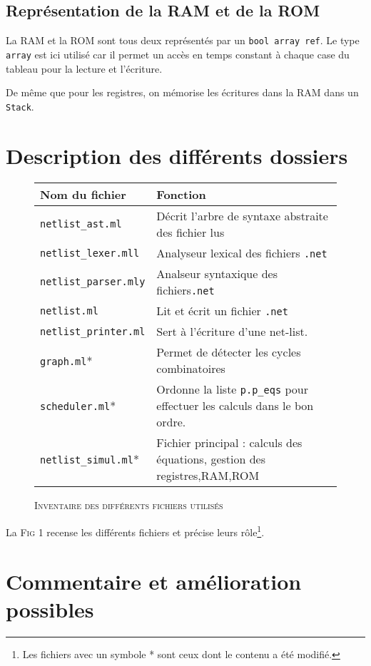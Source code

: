 \documentclass[11pt,a4paper]{article}
\begin{document}
\subsection{Représentation de la RAM et de la ROM}

La RAM et la ROM sont tous deux représentés par un \verb&bool array ref&.
Le type \verb&array& est ici utilisé car il permet un accès en temps constant à chaque case du tableau pour la lecture et l'écriture.

De même que pour les registres, on mémorise les écritures dans la RAM dans un \verb&Stack&.

\section{Description des différents dossiers}

\begin{figure}[H]
\centering	
\begin{tabular}{| l | l |}
\hline
Nom du fichier & Fonction \\ 
\hline
\verb&netlist_ast.ml& & Décrit l'arbre de syntaxe abstraite des fichier lus \\ 
\hline
\verb&netlist_lexer.mll& & Analyseur lexical des fichiers \verb&.net& \\
\hline
\verb&netlist_parser.mly& & Analseur syntaxique des fichiers\verb&.net& \\
\hline
\verb&netlist.ml& & Lit et écrit un fichier \verb&.net& \\
\hline 
\verb&netlist_printer.ml& & Sert à l'écriture d'une net-list. \\
\hline
\verb&graph.ml&* & Permet de détecter les cycles combinatoires \\
\hline
\verb&scheduler.ml&* & Ordonne la liste \verb&p.p_eqs& pour effectuer les calculs dans le bon ordre. \\
\hline
\verb&netlist_simul.ml&* & Fichier principal : calculs des équations, gestion des registres,RAM,ROM \\ 
\hline

\hline
\end{tabular}
\caption{\textsc{Inventaire des différents fichiers utilisés} }
\end{figure}

La \textsc{Fig 1} recense les différents fichiers et précise leurs rôle\footnote{Les fichiers avec un symbole * sont ceux dont le contenu a été modifié.}.

\section{Commentaire et amélioration possibles}
\end{document}

